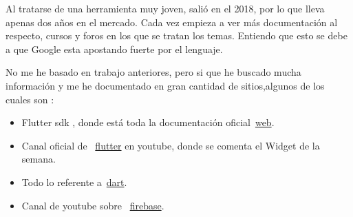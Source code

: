 
Al tratarse de una herramienta muy joven, salió en el 2018, por lo que lleva apenas dos años en el mercado. Cada vez empieza a ver más documentación al respecto, cursos y foros en los que se tratan los temas. Entiendo que esto se debe a que Google esta apostando fuerte por el lenguaje. 

No me he basado en trabajo anteriores, pero si que he buscado mucha información y me he documentado en gran cantidad de sitios,algunos de los cuales son :


\begin{itemize}
	\item Flutter sdk , donde está toda la documentación oficial~\href{https://flutter.dev/}{web}.
	\item Canal oficial de  ~\href{https://www.youtube.com/watch?v=ukLBCRBlIkk&list=PLjxrf2q8roU1kMpfyJ4EY0pID2oRHtvGm}{flutter} en youtube, donde se comenta el Widget de la semana.
	\item Todo lo referente a~\href{https://api.dart.dev/stable/2.8.4/index.html}{dart}.
	\item Canal de youtube sobre ~\href{https://www.youtube.com/channel/UCP4bf6IHJJQehibu6ai__cg}{firebase}.
\end{itemize}